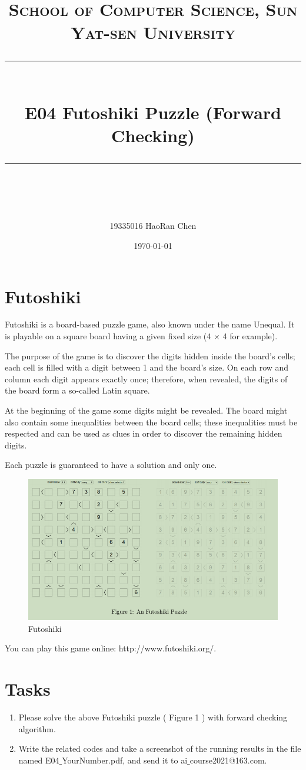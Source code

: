 \documentclass[UTF8]{ctexart}
\title{	
\normalfont \normalsize
\textsc{School of Computer Science, Sun Yat-sen University} \\ [25pt] %
\rule{\textwidth}{0.5pt} \\[0.4cm] %
\huge  E04 Futoshiki Puzzle (Forward Checking) \\ %
\rule{\textwidth}{2pt} \\[0.5cm] %
\author{19335016 HaoRan Chen}
\date{\normalsize \today} 
}
\begin{document}
\maketitle
\tableofcontents
\newpage

\section{Futoshiki}
Futoshiki is a board-based puzzle game, also known under the name Unequal. It is playable on a square board having a given fixed size (4 × 4 for example).

The purpose of the game is to discover the digits hidden inside the board’s cells; each cell is filled with a digit between 1 and the board’s size. On each row and column each digit appears exactly once; therefore, when revealed, the digits of the board form a so-called Latin square.

At the beginning of the game some digits might be revealed. The board might also contain some inequalities between the board cells; these inequalities must be respected and can be used as clues in order to discover the remaining hidden digits.

Each puzzle is guaranteed to have a solution and only one.

\begin{figure}
    \centering
    \includegraphics[width=15cm]{E04_Futoshi/figure1.png}
    \caption{Futoshiki}
    \label{fig:my_label}
\end{figure}

You can play this game online: http://www.futoshiki.org/.




\section{Tasks}
\begin{enumerate}

\item  Please solve the above Futoshiki puzzle ( Figure 1 ) with forward checking algorithm.

\item  Write the related codes and take a screenshot of the running results in the file named E04$\_$YourNumber.pdf, and send it to ai$\_$course2021@163.com.

\end{enumerate}
\end{document}
